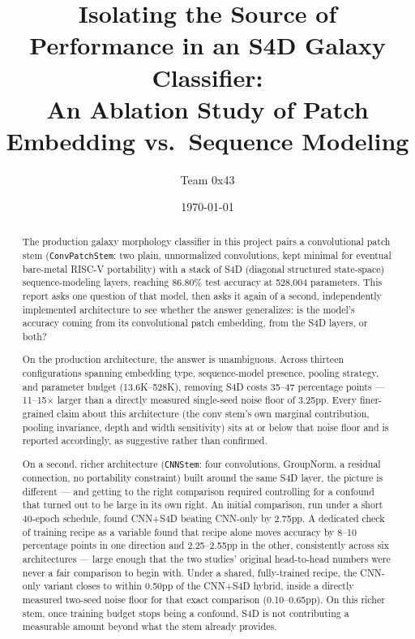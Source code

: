 \documentclass[11pt]{article}
\title{\textbf{Isolating the Source of Performance in an S4D Galaxy Classifier:\\
An Ablation Study of Patch Embedding vs.\ Sequence Modeling}}
\author{Team 0x43}
\date{\today}
\begin{document}
\maketitle

\begin{abstract}
The production galaxy morphology classifier in this project pairs a convolutional patch stem
(\texttt{ConvPatchStem}: two plain, unnormalized convolutions, kept minimal for eventual
bare-metal RISC-V portability) with a stack of S4D (diagonal structured state-space)
sequence-modeling layers, reaching 86.80\% test accuracy at 528{,}004 parameters. This report
asks one question of that model, then asks it again of a second, independently implemented
architecture to see whether the answer generalizes: is the model's accuracy coming from its
convolutional patch embedding, from the S4D layers, or both?

On the production architecture, the answer is unambiguous. Across thirteen configurations
spanning embedding type, sequence-model presence, pooling strategy, and parameter budget
(13.6K--528K), removing S4D costs 35--47 percentage points --- 11--15$\times$ larger than a
directly measured single-seed noise floor of 3.25pp. Every finer-grained claim about this
architecture (the conv stem's own marginal contribution, pooling invariance, depth and width
sensitivity) sits at or below that noise floor and is reported accordingly, as suggestive
rather than confirmed.

On a second, richer architecture (\texttt{CNNStem}: four convolutions, GroupNorm,
a residual connection, no portability constraint) built around the same S4D layer, the
picture is different --- and getting to the right comparison required controlling for a
confound that turned out to be large in its own right. An initial comparison, run under a
short 40-epoch schedule, found CNN+S4D beating CNN-only by 2.75pp. A dedicated check of
training recipe as a variable found that recipe alone moves accuracy by 8--10 percentage
points in one direction and 2.25--2.55pp in the other, consistently across six architectures
--- large enough that the two studies' original head-to-head numbers were never a fair
comparison to begin with. Under a shared, fully-trained recipe, the CNN-only variant closes
to within 0.50pp of the CNN+S4D hybrid, inside a directly measured two-seed noise floor for
that exact comparison (0.10--0.65pp). On this richer stem, once training budget stops being a
confound, S4D is not contributing a measurable amount beyond what the stem already provides.


\end{abstract}
\end{document}
